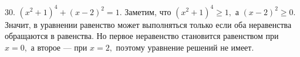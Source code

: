 30. $(x^2+1)^4+(x-2)^2=1.$ Заметим, что $(x^2+1)^4\geqslant1,$ а $(x-2)^2\geqslant0.$ Значит, в уравнении равенство может выполняться только если оба неравенства обращаются в равенства. Но первое неравенство становится равенством при $x=0,$ а второе --- при $x=2,$ поэтому уравнение решений не имеет.\\
